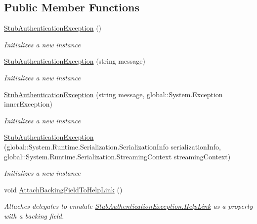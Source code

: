 \subsection*{Public Member Functions}
\begin{DoxyCompactItemize}
\item 
\hyperlink{class_system_1_1_security_1_1_authentication_1_1_fakes_1_1_stub_authentication_exception_ac343eac58fbbdce4c190a09603c319cd}{Stub\-Authentication\-Exception} ()
\begin{DoxyCompactList}\small\item\em Initializes a new instance\end{DoxyCompactList}\item 
\hyperlink{class_system_1_1_security_1_1_authentication_1_1_fakes_1_1_stub_authentication_exception_a8768e89a3099acf6353f43dc40ff48b1}{Stub\-Authentication\-Exception} (string message)
\begin{DoxyCompactList}\small\item\em Initializes a new instance\end{DoxyCompactList}\item 
\hyperlink{class_system_1_1_security_1_1_authentication_1_1_fakes_1_1_stub_authentication_exception_a5587b718210b530981243445646351b6}{Stub\-Authentication\-Exception} (string message, global\-::\-System.\-Exception inner\-Exception)
\begin{DoxyCompactList}\small\item\em Initializes a new instance\end{DoxyCompactList}\item 
\hyperlink{class_system_1_1_security_1_1_authentication_1_1_fakes_1_1_stub_authentication_exception_ad21fcd844e7c3f369f5a14e546d9bea5}{Stub\-Authentication\-Exception} (global\-::\-System.\-Runtime.\-Serialization.\-Serialization\-Info serialization\-Info, global\-::\-System.\-Runtime.\-Serialization.\-Streaming\-Context streaming\-Context)
\begin{DoxyCompactList}\small\item\em Initializes a new instance\end{DoxyCompactList}\item 
void \hyperlink{class_system_1_1_security_1_1_authentication_1_1_fakes_1_1_stub_authentication_exception_a87c2c8db4d8d03d27086bebc204e8fde}{Attach\-Backing\-Field\-To\-Help\-Link} ()
\begin{DoxyCompactList}\small\item\em Attaches delegates to emulate \hyperlink{class_system_1_1_security_1_1_authentication_1_1_fakes_1_1_stub_authentication_exception_ab0dc75cd6cdb5a0fd022584ca23f2788}{Stub\-Authentication\-Exception.\-Help\-Link} as a property with a backing field.\end{DoxyCompactList}\item 

\end{DoxyCompactItemize}
